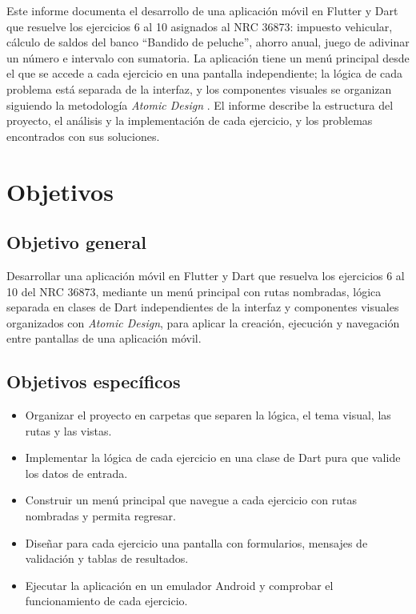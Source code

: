 \documentclass[12pt,a4paper]{article}
\begin{document}
Este informe documenta el desarrollo de una aplicación móvil en Flutter y Dart que resuelve los ejercicios 6 al 10 asignados al NRC 36873: impuesto vehicular, cálculo de saldos del banco ``Bandido de peluche'', ahorro anual, juego de adivinar un número e intervalo con sumatoria. La aplicación tiene un menú principal desde el que se accede a cada ejercicio en una pantalla independiente; la lógica de cada problema está separada de la interfaz, y los componentes visuales se organizan siguiendo la metodología \textit{Atomic Design} \citep{frost2016}. El informe describe la estructura del proyecto, el análisis y la implementación de cada ejercicio, y los problemas encontrados con sus soluciones.

\section{Objetivos}

\subsection{Objetivo general}

Desarrollar una aplicación móvil en Flutter y Dart que resuelva los ejercicios 6 al 10 del NRC 36873, mediante un menú principal con rutas nombradas, lógica separada en clases de Dart independientes de la interfaz y componentes visuales organizados con \textit{Atomic Design}, para aplicar la creación, ejecución y navegación entre pantallas de una aplicación móvil.

\subsection{Objetivos específicos}

\begin{itemize}[leftmargin=1.5cm]
  \item Organizar el proyecto en carpetas que separen la lógica, el tema visual, las rutas y las vistas.
  \item Implementar la lógica de cada ejercicio en una clase de Dart pura que valide los datos de entrada.
  \item Construir un menú principal que navegue a cada ejercicio con rutas nombradas y permita regresar.
  \item Diseñar para cada ejercicio una pantalla con formularios, mensajes de validación y tablas de resultados.
  \item Ejecutar la aplicación en un emulador Android y comprobar el funcionamiento de cada ejercicio.
\end{itemize}
\end{document}

